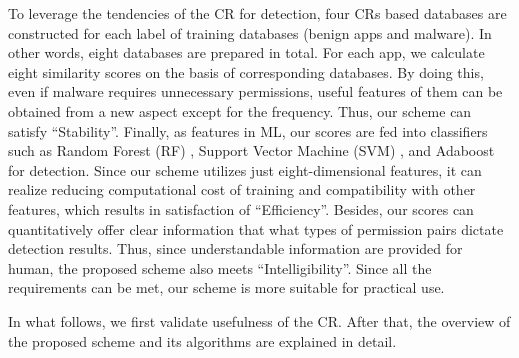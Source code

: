 \documentclass{ieeeaccess}
\begin{document}
To leverage the tendencies of the CR for detection, four CRs based databases are constructed for each label of training databases (benign apps and malware).
In other words, eight databases are prepared in total.
For each app, we calculate eight similarity scores on the basis of corresponding databases.
By doing this, even if malware requires unnecessary permissions, useful features of them can be obtained from a new aspect except for the frequency.
Thus, our scheme can satisfy ``Stability''.
Finally, as features in ML, our scores are fed into classifiers such as Random Forest (RF) \cite{breiman2001random}, Support Vector Machine (SVM) \cite{cortes1995support}, and Adaboost \cite{freund1997decision} for detection.
Since our scheme utilizes just eight-dimensional features, it can realize reducing computational cost of training and compatibility with other features, which results in satisfaction of ``Efficiency''.  
Besides, our scores can quantitatively offer clear information that what types of permission pairs dictate detection results.
Thus, since understandable information are provided for human, the proposed scheme also meets ``Intelligibility''.
Since all the requirements can be met, our scheme is more suitable for practical use.

In what follows, we first validate usefulness of the CR.  
After that, the overview of the proposed scheme and its algorithms are explained in detail.

\end{document}
